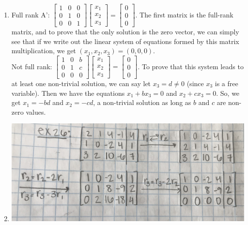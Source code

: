 \documentclass{article}
\begin{document}
\begin{enumerate}
	\item Full rank A':
	$\begin{bmatrix}
		1	&0	&0\\
		0	&1	&0\\
		0	&0	&1
	\end{bmatrix}	
	\begin{bmatrix}
		x_1\\
		x_2\\
		x_3
	\end{bmatrix}
	= 
	\begin{bmatrix}
		0\\
		0\\
		0
	\end{bmatrix}
	$. The first matrix is the full-rank matrix, and to prove that the only solution is the zero vector, we can simply see that if we write out the linear system of equations formed by this matrix multiplication, we get $(x_1, x_2, x_3) = (0, 0, 0)$. \\
	Not full rank:
	$\begin{bmatrix}
		1	&0	&b\\
		0	&1	&c\\
		0	&0	&0
	\end{bmatrix}	
	\begin{bmatrix}
		x_1\\
		x_2\\
		x_3
	\end{bmatrix}
	= 
	\begin{bmatrix}
		0\\
		0\\
		0
	\end{bmatrix}
	$. To prove that this system leads to at least one non-trivial solution, we can say let $x_3=d\neq 0$ (since $x_3$ is a free variable). Then we have the equations $x_1 + bx_3 = 0$ and $x_2 + cx_3 = 0$. So, we get $x_1 = -bd$ and $x_2 = -cd$, a non-trivial solution as long as $b$ and $c$ are non-zero values. 
	
	\item 
	\includegraphics[scale=0.1]{exercise26}

\end{enumerate}
\end{document}
